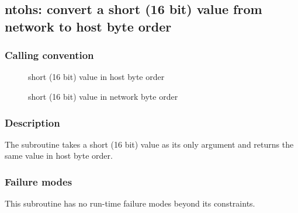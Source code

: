 \clearpage
{}
{}
\label{subr:ntohs}
\subsection*{ntohs: convert a short (16 bit) value from network to
  host byte order}

\subsubsection*{Calling convention}

\begin{description}
\item[] short (16 bit) value in host byte order
\item[] short (16 bit) value in network byte order
\end{description}

\subsubsection*{Description}

The  subroutine takes a short (16 bit) value as its
only argument and returns the same value in host byte order.

\subsubsection*{Failure modes}

This subroutine has no run-time failure modes beyond its constraints.

